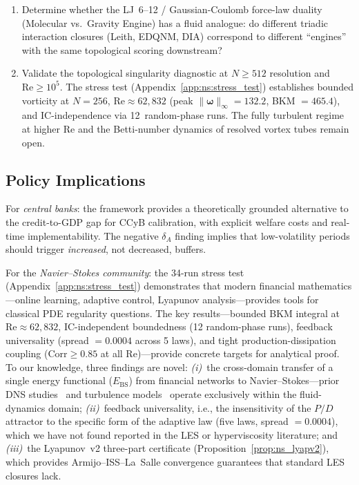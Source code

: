 \documentclass[final]{siamltex}
\begin{document}
\begin{enumerate}
\item Determine whether the LJ~6--12 / Gaussian-Coulomb force-law
  duality (Molecular vs.\ Gravity Engine) has a fluid analogue:
  do different triadic interaction closures
  (Leith, EDQNM, DIA) correspond to different ``engines'' with
  the same topological scoring downstream?

\item Validate the topological singularity diagnostic at
  $N \ge 512$ resolution and $\mathrm{Re} \ge 10^5$.  The
  stress test (Appendix~\ref{app:ns:stress_test}) establishes
  bounded vorticity at $N=256$, $\mathrm{Re}\approx 62{,}832$
  (peak $\|\bm{\omega}\|_\infty = 132.2$, BKM $= 465.4$),
  and IC-independence via 12~random-phase runs.
  The fully turbulent regime at higher Re and the
  Betti-number dynamics of resolved vortex tubes remain open.
\end{enumerate}

\subsection{Policy Implications}

For \emph{central banks}: the framework provides a theoretically
grounded alternative to the credit-to-GDP gap for CCyB calibration,
with explicit welfare costs and real-time implementability.
The negative $\delta_A$ finding implies that low-volatility periods
should trigger \emph{increased}, not decreased, buffers.

For the \emph{Navier--Stokes community}: the 34-run stress test
(Appendix~\ref{app:ns:stress_test}) demonstrates that modern
financial mathematics---online learning, adaptive control,
Lyapunov analysis---provides tools for classical PDE regularity
questions.  The key results---bounded BKM integral at
$\mathrm{Re}\approx 62{,}832$, IC-independent boundedness
(12 random-phase runs), feedback universality
(spread $= 0.0004$ across 5 laws), and tight
production-dissipation coupling ($\mathrm{Corr} \ge 0.85$
at all Re)---provide concrete targets for analytical proof.
To our knowledge, three findings are novel:
\emph{(i)}~the cross-domain transfer of a single energy functional
($E_{\mathrm{BS}}$) from financial networks to
Navier--Stokes---prior DNS studies~\cite{kerr1993,houli2006}
and turbulence models~\cite{smagorinsky1963,germano1991}
operate exclusively within the fluid-dynamics domain;
\emph{(ii)}~feedback universality, i.e., the insensitivity of
the $P/D$ attractor to the specific form of the adaptive law
(five laws, spread $= 0.0004$), which we have not found
reported in the LES or hyperviscosity literature;
and \emph{(iii)}~the Lyapunov~v2 three-part certificate
(Proposition~\ref{prop:ns_lyapv2}), which provides
Armijo--ISS--La~Salle convergence guarantees that standard
LES closures lack.
\end{document}

